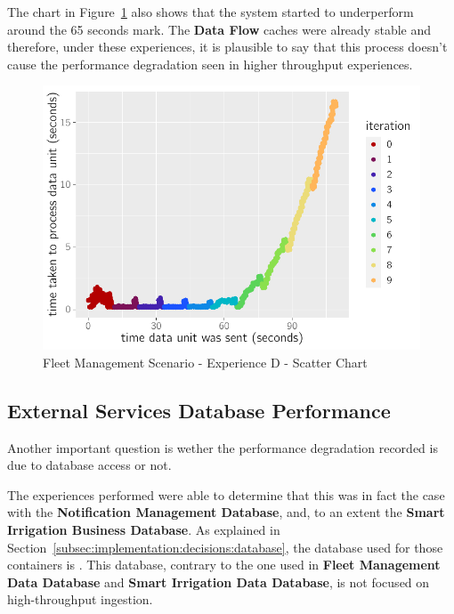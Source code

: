  The chart in Figure~\ref{fig:evaluation:overview:cache:chart:s1eD} also shows that the system started to underperform around the 65 seconds mark. The \textbf{Data Flow} caches were already stable and therefore, under these experiences, it is plausible to say that this process doesn't cause the performance degradation seen in higher throughput experiences.

\begin{figure}[H]
    \centering
    \includegraphics[page=1]{assets/charts/s1eD.pdf}
    \caption[Fleet Management Scenario - Experience D - Scatter Chart]{Fleet Management Scenario - Experience D - Scatter Chart}
    \label{fig:evaluation:overview:cache:chart:s1eD}
\end{figure}

\subsection{External Services Database Performance}
\label{subsec:evaluation:overview:servicedatabase}

Another important question is wether the performance degradation recorded is due to database access or not.

The experiences performed were able to determine that this was in fact the case with the \textbf{Notification Management Database}, and, to an extent the \textbf{Smart Irrigation Business Database}. As explained in Section~\ref{subsec:implementation:decisions:database}, the database used for those containers is .
This database, contrary to the one used in \textbf{Fleet Management Data Database} and \textbf{Smart Irrigation Data Database}, is not focused on high-throughput ingestion.

